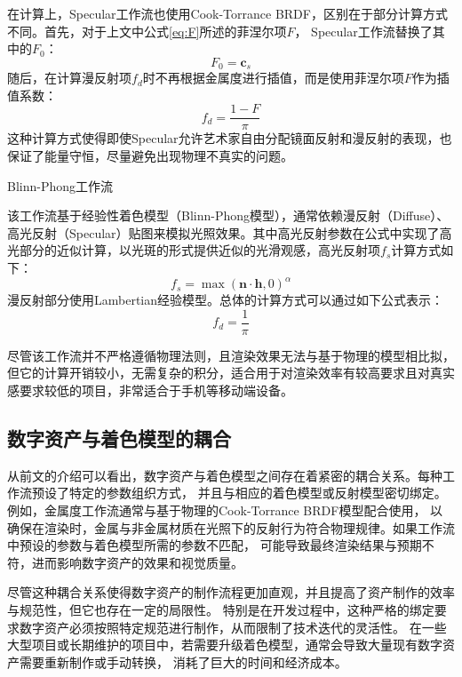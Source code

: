 在计算上，Specular工作流也使用Cook-Torrance BRDF，区别在于部分计算方式不同。首先，对于上文中公式\eqref{eq:F}所述的菲涅尔项$F$，
Specular工作流替换了其中的$F_0$：
\begin{equation}\label{eq:F0_spec}
F_0=\bm{c}_s
\end{equation}
随后，在计算漫反射项$f_d$时不再根据金属度进行插值，而是使用菲涅尔项$F$作为插值系数：
\begin{equation}\label{eq:diffuse_spec}
f_d=\frac{1-F}{\pi}
\end{equation}
这种计算方式使得即使Specular允许艺术家自由分配镜面反射和漫反射的表现，也保证了能量守恒，尽量避免出现物理不真实的问题。

 Blinn-Phong工作流

该工作流基于经验性着色模型（Blinn-Phong模型），通常依赖漫反射（Diffuse）、高光反射（Specular）贴图来模拟光照效果。其中高光反射参数在公式中实现了高光部分的近似计算，以光斑的形式提供近似的光滑观感，高光反射项$f_s$计算方式如下：
\begin{equation}\label{eq:specular_BlinnPhong}
f_s=\max(\mathbf{n}\cdot \mathbf{h},0)^\alpha
\end{equation}
漫反射部分使用Lambertian经验模型。总体的计算方式可以通过如下公式表示：
\begin{equation}\label{eq:diffuse_BlinnPhong}
f_d=\frac{1}{\pi}
\end{equation}

尽管该工作流并不严格遵循物理法则，且渲染效果无法与基于物理的模型相比拟，但它的计算开销较小，无需复杂的积分，适合用于对渲染效率有较高要求且对真实感要求较低的项目，非常适合于手机等移动端设备。

\subsection{数字资产与着色模型的耦合}
从前文的介绍可以看出，数字资产与着色模型之间存在着紧密的耦合关系。每种工作流预设了特定的参数组织方式，
并且与相应的着色模型或反射模型密切绑定。例如，金属度工作流通常与基于物理的Cook-Torrance BRDF模型配合使用，
以确保在渲染时，金属与非金属材质在光照下的反射行为符合物理规律。如果工作流中预设的参数与着色模型所需的参数不匹配，
可能导致最终渲染结果与预期不符，进而影响数字资产的效果和视觉质量。

尽管这种耦合关系使得数字资产的制作流程更加直观，并且提高了资产制作的效率与规范性，但它也存在一定的局限性。
特别是在开发过程中，这种严格的绑定要求数字资产必须按照特定规范进行制作，从而限制了技术迭代的灵活性。
在一些大型项目或长期维护的项目中，若需要升级着色模型，通常会导致大量现有数字资产需要重新制作或手动转换，
消耗了巨大的时间和经济成本。


